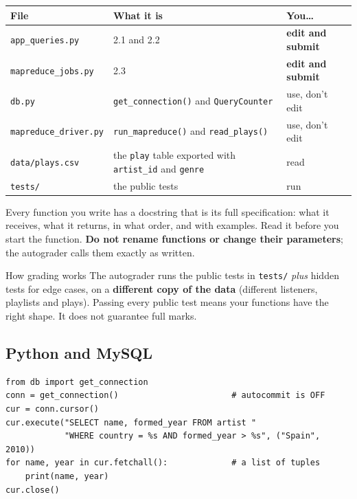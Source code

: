 \documentclass[11pt]{article}
\newcommand{\code}[1]{\texttt{#1}}
\begin{document}
\begin{center}
\begin{tabularx}{\linewidth}{@{}l X l@{}}
\toprule
\textbf{File} & \textbf{What it is} & \textbf{You\ldots}\\
\midrule
\code{app\_queries.py}     & 2.1 and 2.2                                         & \textbf{edit and submit}\\
\code{mapreduce\_jobs.py}  & 2.3                                                & \textbf{edit and submit}\\
\code{db.py}               & \code{get\_connection()} and \code{QueryCounter}  & use, don't edit\\
\code{mapreduce\_driver.py}& \code{run\_mapreduce()} and \code{read\_plays()}  & use, don't edit\\
\code{data/plays.csv}      & the \code{play} table exported with \code{artist\_id} and \code{genre} & read\\
\code{tests/}              & the public tests                                  & run\\
\bottomrule
\end{tabularx}
\end{center}

Every function you write has a docstring that is its full specification: what
it receives, what it returns, in what order, and with examples. Read it before
you start the function. \textbf{Do not rename functions or change their
parameters}; the autograder calls them exactly as written.

\begin{notebox}{How grading works}
The autograder runs the public tests in \code{tests/} \emph{plus} hidden tests
for edge cases, on a \textbf{different copy of the data} (different listeners,
playlists and plays). Passing every public test means your functions have the
right shape. It does not guarantee full marks.
\end{notebox}

\subsection*{Python and MySQL}

\begin{lstlisting}[style=py]
from db import get_connection
conn = get_connection()                       # autocommit is OFF
cur = conn.cursor()
cur.execute("SELECT name, formed_year FROM artist "
            "WHERE country = %s AND formed_year > %s", ("Spain", 2010))
for name, year in cur.fetchall():             # a list of tuples
    print(name, year)
cur.close()
\end{lstlisting}
\end{document}
